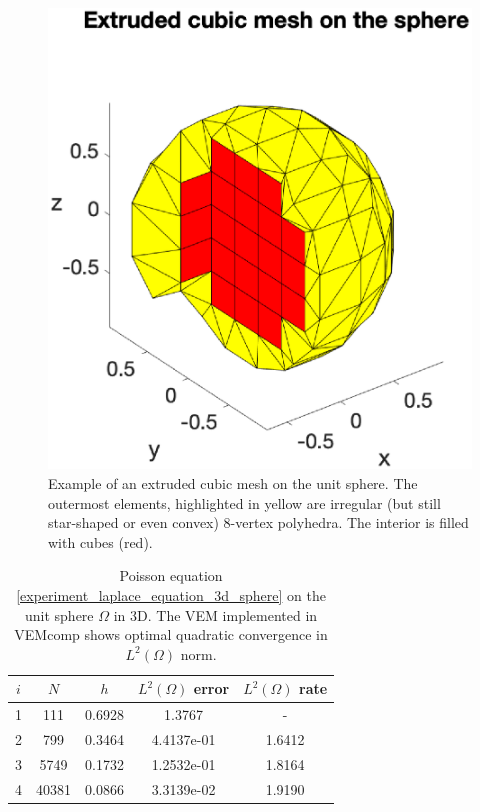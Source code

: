 \documentclass[a4paper]{article}
\begin{document}
\begin{figure}[H]
\begin{center}
\includegraphics[scale=0.5]{extruded_mesh_sphere.eps}
\end{center}
\caption{Example of an extruded cubic mesh on the unit sphere.  The outermost elements, highlighted in yellow are irregular (but still star-shaped or even convex) $8$-vertex polyhedra.  The interior is filled with cubes (red).}
\label{fig:extruded_mesh_sphere}
\end{figure} 

\begin{table}[H]
\caption{Poisson equation \eqref{experiment_laplace_equation_3d_sphere} on the unit sphere $\Omega$ in 3D. The VEM implemented in VEMcomp shows optimal quadratic convergence in $L^2(\Omega)$ norm.}
\begin{center}
\begin{tabular}{c | c | c | c | c}
$i$ & $N$ & $h$ & $L^2(\Omega)$ error & $L^2(\Omega)$ rate\\
\hline
1 & 111 & 0.6928 &   1.3767 &  -   \\
2 & 799 & 0.3464 & 4.4137e-01 & 1.6412    \\
3 & 5749 & 0.1732 & 1.2532e-01 & 1.8164    \\
4 & 40381 & 0.0866 &  3.3139e-02 & 1.9190
\end{tabular}
\end{center}
\label{tab:laplace_3d_convergence_sphere}
\end{table}
\end{document}
